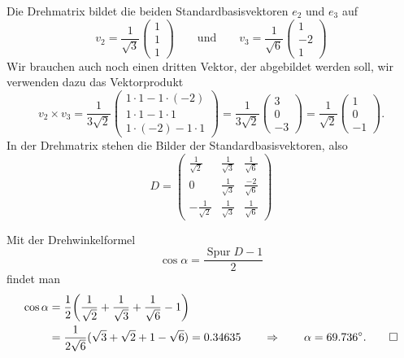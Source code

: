 \begin{loesung}
\begin{teilaufgaben}
\item
Die Drehmatrix bildet die beiden Standardbasisvektoren $e_2$ und $e_3$ auf
\[
v_2
=
\frac{1}{\sqrt{3}}
\begin{pmatrix}
1\\1\\1
\end{pmatrix}
\qquad\text{und}\qquad
v_3
=
\frac{1}{\sqrt{6}}
\begin{pmatrix}
1\\-2\\1
\end{pmatrix}
\]
Wir brauchen auch noch einen dritten Vektor, der abgebildet werden soll,
wir verwenden dazu das Vektorprodukt
\[
v_2\times v_3
=
\frac{1}{3\sqrt{2}}
\begin{pmatrix}
1\cdot 1-1\cdot(-2)\\
1\cdot 1-1\cdot 1\\
1\cdot(-2)-1\cdot 1
\end{pmatrix}
=
\frac{1}{3\sqrt{2}}
\begin{pmatrix}
3\\0\\-3
\end{pmatrix}
=
\frac{1}{\sqrt{2}}
\begin{pmatrix}
1\\0\\-1
\end{pmatrix}.
\]
In der Drehmatrix stehen die Bilder der Standardbasisvektoren, also
\[
D
=
\begin{pmatrix}
 \frac{1}{\sqrt{2}}&\frac{1}{\sqrt{3}}&\frac{ 1}{\sqrt{6}}\\
                  0&\frac{1}{\sqrt{3}}&\frac{-2}{\sqrt{6}}\\
-\frac{1}{\sqrt{2}}&\frac{1}{\sqrt{3}}&\frac{ 1}{\sqrt{6}}
\end{pmatrix}
\]
\item
Mit der Drehwinkelformel 
\[
\cos \alpha = \frac{\operatorname{Spur}D-1}{2}
\]
findet man
\begin{align*}
\cos \alpha
&= 
\frac12\biggl(
\frac{1}{\sqrt{2}}
+
\frac{1}{\sqrt{3}}
+
\frac{1}{\sqrt{6}}
-1\biggr)
\\
&=
\frac1{2\sqrt{6}}(\sqrt{3}+\sqrt{2}+1-\sqrt{6})
=
0.34635
\qquad\Rightarrow\qquad
\alpha = 69.736^\circ.
\qedhere
\end{align*}
\end{teilaufgaben}
\end{loesung}

